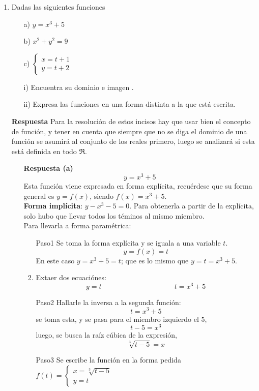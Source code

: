 \documentclass[10pt,twoside]{SelfArx} %
\begin{document}
\begin{enumerate}
	\item Dadas las siguientes funciones %
		\begin{enumerate}
			\item[a)]$  y=x^{3}+5  $
			\item[b)] $ x^{2}+y^{2}=9 $ 
			\item[c)] $ \begin{cases}
			x=t+1\\
			y=t+2
			\end{cases} $ 
		\end{enumerate}
		\begin{enumerate}
			\item[i)]		Encuentra su dominio e imagen .
			\item[ii)]		Expresa las funciones en una forma distinta a la que está escrita.
		\end{enumerate}
\textbf{Respuesta}	%
Para la resolución de estos incisos hay que usar bien el concepto de función, y tener en cuenta que siempre que no se diga el dominio de una función se asumirá al conjunto de los reales primero, luego se analizará si esta está definida en todo $ \Re $.
\begin{enumerate}
	\item[\textbf{Respuesta (a)}]
	\[ y=x^{3}+5 \]
	Esta funci\'on viene expresada en forma expl\'icita, recu\'erdese  que su forma general es $ y=f(x) $, siendo $ f(x)=x^{3}+5 $.\\
	\textbf{Forma impl\'icita}: $ y-x^{3}-5=0 $. Para obtenerla a partir de la expl\'icita, solo hubo que llevar todos los t\'eminos al mismo miembro.\\
	Para llevarla a forma param\'etrica:\\
	\begin{enumerate}
		\item[Paso1]	Se toma la forma expl\'icita y se iguala a una variable $ t $.\\
		\[  y=f(x)=t  \]
		En este caso $ y=x^{3}+5=t $; que es lo mismo que $ y=t=x^{3}+5 $.
		\item	Extaer dos ecuaci\'ones: 
		\[ y=t\;\;\;\;\;\;\;\;\;\;\;\;\;\;\;\;\;\;\;\;\;\;\;\;\;\;\;\;\;\;\;\;\;\;\;\;\ t=x^{3}+5 \]
		\item[Paso2]	Hallarle la inversa a la segunda funci\'on:
		\[ t=x^{3}+5 \]
		se toma esta, y se pasa para el miembro izquierdo el $ 5 $,
		\[ t-5=x^{3} \]
		luego, se busca la ra\'iz c\'ubica de la expresi\'on,
		\[ \sqrt[3]{t-5}=x \]
		\item[Paso3] Se escribe la funci\'on en la forma pedida $ f(t)=\begin{cases}
		x=\sqrt[3]{t-5}\\
		y=t
		\end{cases} $
	\end{enumerate}
	

\end{enumerate}
\end{enumerate}
\end{document}

